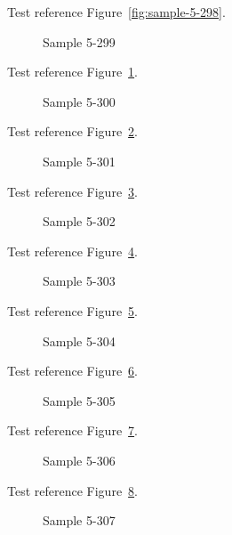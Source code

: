 Test reference Figure~\ref{fig:sample-5-298}.

\begin{figure}[tbhp]
\caption{Sample 5-299}
\label{fig:sample-5-299}
\end{figure}

Test reference Figure~\ref{fig:sample-5-299}.

\begin{figure}[tbhp]
\caption{Sample 5-300}
\label{fig:sample-5-300}
\end{figure}

Test reference Figure~\ref{fig:sample-5-300}.

\begin{figure}[tbhp]
\caption{Sample 5-301}
\label{fig:sample-5-301}
\end{figure}

Test reference Figure~\ref{fig:sample-5-301}.

\begin{figure}[tbhp]
\caption{Sample 5-302}
\label{fig:sample-5-302}
\end{figure}

Test reference Figure~\ref{fig:sample-5-302}.

\begin{figure}[tbhp]
\caption{Sample 5-303}
\label{fig:sample-5-303}
\end{figure}

Test reference Figure~\ref{fig:sample-5-303}.

\begin{figure}[tbhp]
\caption{Sample 5-304}
\label{fig:sample-5-304}
\end{figure}

Test reference Figure~\ref{fig:sample-5-304}.

\begin{figure}[tbhp]
\caption{Sample 5-305}
\label{fig:sample-5-305}
\end{figure}

Test reference Figure~\ref{fig:sample-5-305}.

\begin{figure}[tbhp]
\caption{Sample 5-306}
\label{fig:sample-5-306}
\end{figure}

Test reference Figure~\ref{fig:sample-5-306}.

\begin{figure}[tbhp]
\caption{Sample 5-307}
\label{fig:sample-5-307}
\end{figure}

